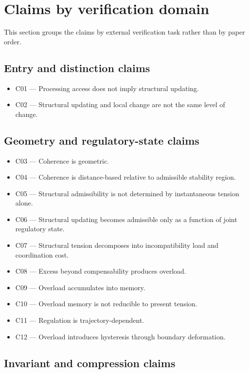 \documentclass[11pt,a4paper]{article}
\begin{document}
	\section{Claims by verification domain}
	
	This section groups the claims by external verification task rather than by paper order.
	
	\subsection{Entry and distinction claims}
	
	\begin{itemize}[leftmargin=2em]
		\item C01 --- Processing access does not imply structural updating.
		\item C02 --- Structural updating and local change are not the same level of change.
	\end{itemize}
	
	\subsection{Geometry and regulatory-state claims}
	
	\begin{itemize}[leftmargin=2em]
		\item C03 --- Coherence is geometric.
		\item C04 --- Coherence is distance-based relative to admissible stability region.
		\item C05 --- Structural admissibility is not determined by instantaneous tension alone.
		\item C06 --- Structural updating becomes admissible only as a function of joint regulatory state.
		\item C07 --- Structural tension decomposes into incompatibility load and coordination cost.
		\item C08 --- Excess beyond compensability produces overload.
		\item C09 --- Overload accumulates into memory.
		\item C10 --- Overload memory is not reducible to present tension.
		\item C11 --- Regulation is trajectory-dependent.
		\item C12 --- Overload introduces hysteresis through boundary deformation.
	\end{itemize}
	
	\subsection{Invariant and compression claims}
	
\end{document}
